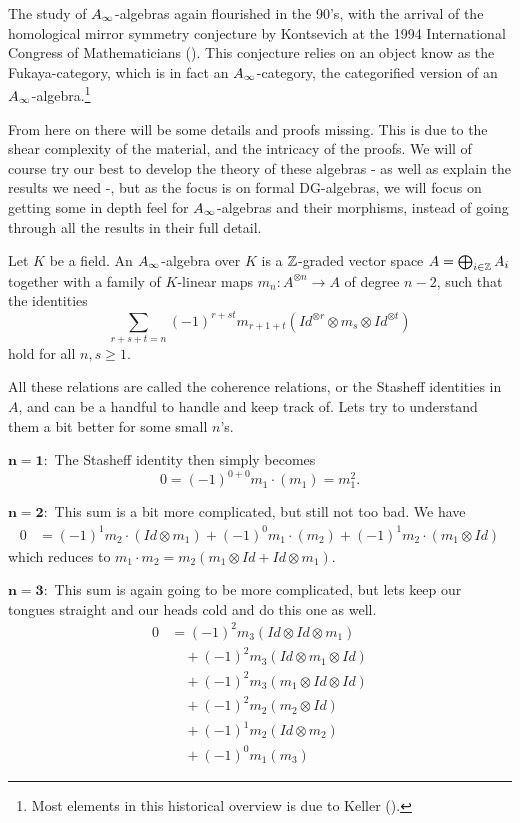 The study of $\A$-algebras again flourished in the 90's, with the arrival of the homological mirror symmetry conjecture by Kontsevich at the 1994 International Congress of Mathematicians (\cite{kontsevich}). This conjecture relies on an object know as the Fukaya-category, which is in fact an $\A$-category, the categorified version of an $\A$-algebra.\footnote{Most elements in this historical overview is due to Keller (\cite{keller}).}

From here on there will be some details and proofs missing. This is due to the shear complexity of the material, and the intricacy of the proofs. We will of course try our best to develop the theory of these algebras - as well as explain the results we need -, but as the focus is on formal DG-algebras, we will focus on getting some in depth feel for $\A$-algebras and their morphisms, instead of going through all the results in their full detail.   

\begin{definition}[$\A$-algebra]
    Let $K$ be a field. An $\A$-algebra over $K$ is a $\mathbb{Z}$-graded vector space $A=\bigoplus_{i\in \mathbb{Z}}A_i$ together with a family of $K$-linear maps $m_n : A^{\otimes n}\rightarrow A$ of degree $n-2$, such that the identities 
    \begin{equation*}
        \sum_{r+s+t = n}(-1)^{r+st}m_{r+1+t}(Id^{\otimes r}\otimes m_s \otimes Id^{\otimes t})
    \end{equation*}
    hold for all $n, s\geq 1$. 
\end{definition}

All these relations are called the coherence relations, or the Stasheff identities in $A$, and can be a handful to handle and keep track of. Lets try to understand them a bit better for some small $n$'s. 

$\mathbf{n=1 :}$ The Stasheff identity then simply becomes
\begin{equation*}
    0 = (-1)^{0+0}m_1 \cdot (m_1) = m_1^2 .
\end{equation*}

$\mathbf{n=2 :}$ This sum is a bit more complicated, but still not too bad. We have
\begin{align*}
    0 
    &= (-1)^{1}m_2\cdot(Id\otimes m_1)+(-1)^{0}m_1\cdot (m_2)+(-1)^{1}m_2\cdot (m_1\otimes Id)
\end{align*}
which reduces to $m_1 \cdot m_2 = m_2(m_1\otimes Id + Id\otimes m_1)$. 

$\mathbf{n=3 :}$ This sum is again going to be more complicated, but lets keep our tongues straight and our heads cold and do this one as well. 
\begin{align*}
    0 
    &= (-1)^{2}m_3(Id\otimes Id \otimes m_1) \\
    &\quad + (-1)^{2}m_3(Id\otimes m_1 \otimes Id) \\
    &\quad + (-1)^{2}m_3(m_1\otimes Id \otimes Id) \\
    &\quad + (-1)^{2}m_2(m_2\otimes Id) \\
    &\quad + (-1)^{1}m_2(Id\otimes m_2) \\
    &\quad + (-1)^{0}m_1(m_3) 
\end{align*}

